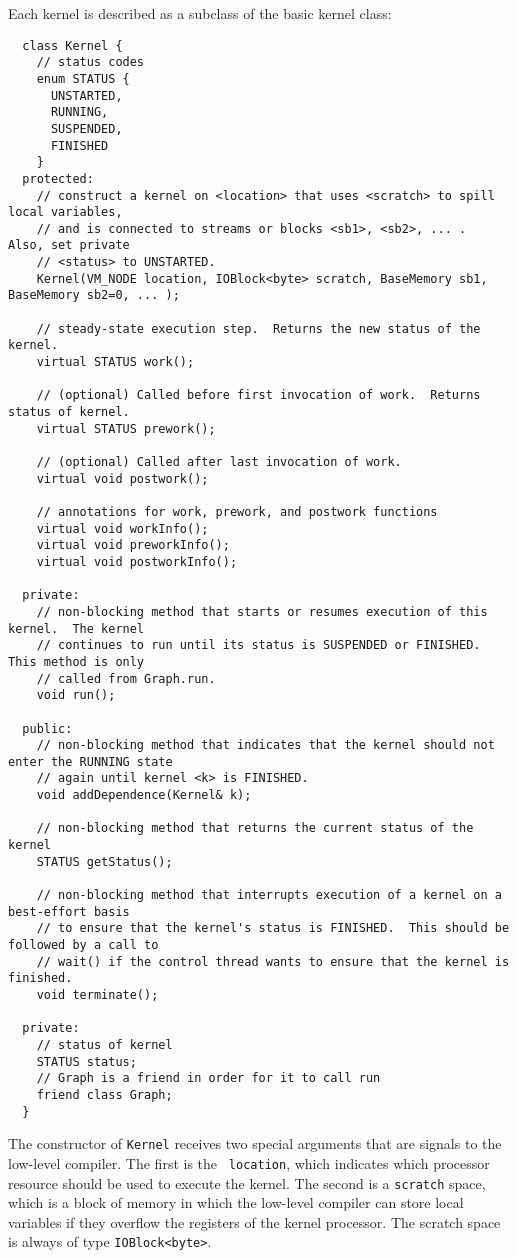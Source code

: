 Each kernel is described as a subclass of the basic kernel class:
{\small
\begin{verbatim}
  class Kernel {
    // status codes
    enum STATUS {
      UNSTARTED,
      RUNNING,
      SUSPENDED,
      FINISHED
    }
  protected:
    // construct a kernel on <location> that uses <scratch> to spill local variables,
    // and is connected to streams or blocks <sb1>, <sb2>, ... .  Also, set private 
    // <status> to UNSTARTED.
    Kernel(VM_NODE location, IOBlock<byte> scratch, BaseMemory sb1, BaseMemory sb2=0, ... );

    // steady-state execution step.  Returns the new status of the kernel.
    virtual STATUS work();

    // (optional) Called before first invocation of work.  Returns status of kernel.
    virtual STATUS prework();

    // (optional) Called after last invocation of work.
    virtual void postwork();

    // annotations for work, prework, and postwork functions
    virtual void workInfo();
    virtual void preworkInfo();
    virtual void postworkInfo();

  private:
    // non-blocking method that starts or resumes execution of this kernel.  The kernel 
    // continues to run until its status is SUSPENDED or FINISHED.  This method is only
    // called from Graph.run.
    void run();
   
  public:
    // non-blocking method that indicates that the kernel should not enter the RUNNING state
    // again until kernel <k> is FINISHED.
    void addDependence(Kernel& k);

    // non-blocking method that returns the current status of the kernel
    STATUS getStatus();

    // non-blocking method that interrupts execution of a kernel on a best-effort basis 
    // to ensure that the kernel's status is FINISHED.  This should be followed by a call to 
    // wait() if the control thread wants to ensure that the kernel is finished.
    void terminate();

  private:
    // status of kernel
    STATUS status;
    // Graph is a friend in order for it to call run
    friend class Graph;
  }  
\end{verbatim}}
The constructor of {\tt Kernel} receives two special arguments that
are signals to the low-level compiler.  The first is the {\tt
location}, which indicates which processor resource should be used to
execute the kernel.  The second is a {\tt scratch} space, which is a
block of memory in which the low-level compiler can store local
variables if they overflow the registers of the kernel processor.  The
scratch space is always of type {\tt IOBlock<byte>}.  

